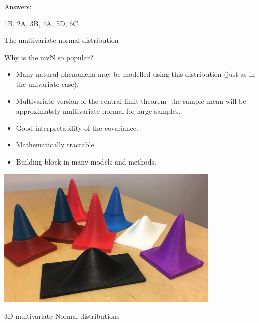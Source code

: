 \documentclass[ignorenonframetext,]{beamer}
\providecommand{\tightlist}{%
  \setlength{\itemsep}{0pt}\setlength{\parskip}{0pt}}
\begin{document}
\begin{frame}

\begin{block}{Answers:}

1B, 2A, 3B, 4A, 5D, 6C

\end{block}

\end{frame}

\begin{frame}{The multivariate normal distribution}

\vspace{2mm}

Why is the mvN so popular?

\begin{itemize}
\tightlist
\item
  Many natural phenomena may be modelled using this distribution (just
  as in the univariate case).
\item
  Multivariate version of the central limit theorem- the sample mean
  will be approximately multivariate normal for large samples.
\item
  Good interpretability of the covariance.
\item
  Mathematically tractable.
\item
  Building block in many models and methods.
\end{itemize}

\end{frame}

\begin{frame}

\centering
\includegraphics[width=0.80000\textwidth]{mvN.jpeg}

3D multivariate Normal distributions

\end{frame}
\end{document}
